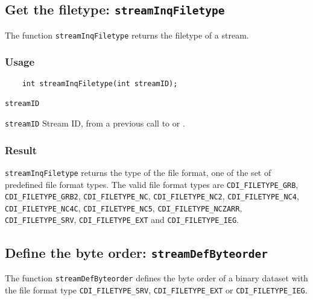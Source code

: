 \subsection{Get the filetype: \texttt{streamInqFiletype}}
\label{streamInqFiletype}

The function {\texttt{streamInqFiletype}} returns the filetype of a stream.

\subsubsection*{Usage}

\begin{verbatim}
    int streamInqFiletype(int streamID);
\end{verbatim}

\hspace*{4mm}\begin{minipage}[]{15cm}
\begin{deflist}{\texttt{streamID}\ }
\item[\texttt{streamID}]
Stream ID, from a previous call to {} or {}.

\end{deflist}
\end{minipage}

\subsubsection*{Result}

{\texttt{streamInqFiletype}} returns the type of the file format,
one of the set of predefined {\CDI} file format types.
The valid {\CDI} file format types are {\texttt{CDI\_FILETYPE\_GRB}}, {\texttt{CDI\_FILETYPE\_GRB2}}, {\texttt{CDI\_FILETYPE\_NC}},
{\texttt{CDI\_FILETYPE\_NC2}}, {\texttt{CDI\_FILETYPE\_NC4}}, {\texttt{CDI\_FILETYPE\_NC4C}}, {\texttt{CDI\_FILETYPE\_NC5}},
{\texttt{CDI\_FILETYPE\_NCZARR}}, {\texttt{CDI\_FILETYPE\_SRV}}, {\texttt{CDI\_FILETYPE\_EXT}} and {\texttt{CDI\_FILETYPE\_IEG}}.


\subsection{Define the byte order: \texttt{streamDefByteorder}}
\label{streamDefByteorder}

The function {\texttt{streamDefByteorder}} defines the byte order of a binary dataset
with the file format type {\texttt{CDI\_FILETYPE\_SRV}}, {\texttt{CDI\_FILETYPE\_EXT}} or {\texttt{CDI\_FILETYPE\_IEG}}.

